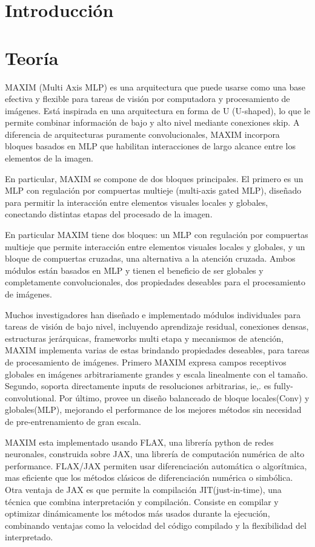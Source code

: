 \documentclass[aps,prl,twocolumn,groupedaddress]{revtex4-2}
\begin{document}
\section{Introducción}


\section{Teoría}

MAXIM (Multi Axis MLP) es una arquitectura que puede usarse como una base efectiva  y flexible para tareas de visión por computadora y procesamiento de imágenes. Está inspirada en una arquitectura en forma de U (U-shaped), lo que le permite combinar información de bajo y alto nivel mediante conexiones skip. A diferencia de arquitecturas puramente convolucionales, MAXIM incorpora bloques basados en MLP que habilitan interacciones de largo alcance entre los elementos de la imagen.

En particular, MAXIM se compone de dos bloques principales. El primero es un MLP con regulación por compuertas multieje (multi-axis gated MLP), diseñado para permitir la interacción entre elementos visuales locales y globales, conectando distintas etapas del procesado de la imagen.

En particular MAXIM tiene dos bloques: un MLP con regulación por compuertas multieje que permite interacción entre elementos visuales locales y globales, y un bloque de compuertas cruzadas, una alternativa a la atención cruzada. Ambos módulos están basados en MLP y tienen el beneficio de ser globales y completamente convolucionales, dos propiedades deseables para el procesamiento de imágenes.

Muchos investigadores han diseñado e implementado módulos individuales  para tareas de visión de bajo nivel, incluyendo aprendizaje residual, conexiones densas, estructuras jerárquicas, frameworks multi etapa y mecanismos de atención, MAXIM implementa varias de estas brindando propiedades deseables, para tareas de procesamiento de imágenes. Primero MAXIM expresa campos receptivos globales en imágenes arbitrariamente grandes y escala linealmente con el tamaño. Segundo, soporta directamente inputs de resoluciones arbitrarias, ie,. es fully-convolutional. Por último, provee un diseño balanceado de bloque locales(Conv) y globales(MLP), mejorando el performance de los mejores métodos sin necesidad de pre-entrenamiento de gran escala.

MAXIM esta implementado usando FLAX, una librería python de redes neuronales, construida sobre JAX, una librería de computación numérica de alto performance. FLAX/JAX permiten usar diferenciación automática o algorítmica, mas eficiente que los métodos clásicos de diferenciación numérica o simbólica. Otra ventaja de JAX es que permite la compilación JIT(just-in-time), una técnica que combina interpretación y compilación. Consiste en compilar y optimizar dinámicamente los métodos más usados durante la ejecución, combinando ventajas como la velocidad del código compilado y la flexibilidad del interpretado.
\end{document}
